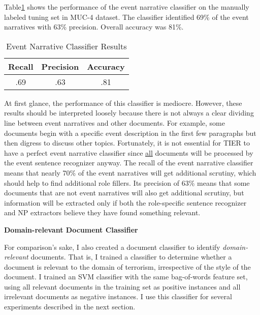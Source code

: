 Table\ref{doc-class-results} shows the performance of the event narrative
classifier on the manually labeled tuning set in MUC-4 dataset. The classifier
identified 69\% of the event narratives with 63\% precision. Overall
accuracy was 81\%. 


\begin{table}[h]
\small
\centering
\begin{tabular}[center]{|ccc|} \hline
{\bf Recall} & {\bf Precision} & {\bf Accuracy} \\  \hline
.69 & .63 & .81\\ \hline
\end{tabular}
\caption{Event Narrative Classifier Results}
\label{doc-class-results}
\end{table}

At first glance, the performance of this classifier is
mediocre. However, these results should be interpreted loosely because
there is not always a clear dividing line between event narratives and
other documents. For example, some documents begin with a specific
event description in the first few paragraphs but then digress to
discuss other topics. Fortunately, it is not essential for TIER to
have a perfect event narrative classifier since \underline{all}
documents will be processed by the event sentence recognizer
anyway. The recall of the event narrative classifier means that nearly
70\% of the event narratives will get additional scrutiny, which
should help to find additional role fillers. Its precision of 63\%
means that some documents that are not event narratives will also get
additional scrutiny, but information will be extracted only if both
the role-specific sentence recognizer and NP extractors believe they
have found something relevant. 

\vspace{.1in}
{\bf Domain-relevant Document Classifier}
\label{domdoc-section}
\vspace{.1in}

For comparison's sake, I also created a document classifier to
identify {\it domain-relevant} documents. That is, I trained a
classifier to determine whether a document is relevant
to the domain of terrorism,  irrespective of  the style of the
document. I trained an SVM classifier with the same bag-of-words
feature set, using all relevant documents in the training set as
positive instances and all irrelevant documents as negative instances.
I use this classifier for several experiments described in the next section.



